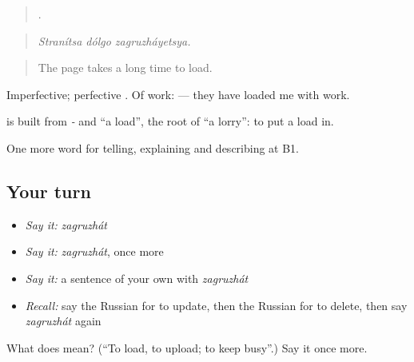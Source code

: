 \begin{quote}
  .
\end{quote}

\begin{quote}
\emph{Stranítsa dólgo zagruzháyetsya.}
\end{quote}

\begin{quote}
The page takes a long time to load.
\end{quote}

Imperfective; perfective \emph{}. Of work: \emph{  } — they have loaded me with work.

\begin{cousinweb}
\textbf{} is built from \emph{-} and \emph{} \textquotedblleft{}a load\textquotedblright{}, the root of \emph{} \textquotedblleft{}a lorry\textquotedblright{}: to put a load in.
\end{cousinweb}

\begin{grammarlens}[title={What you've built}]
One more word for telling, explaining and describing at B1.
\end{grammarlens}

\subsection*{Your turn}
\begin{itemize}
\raggedright
  \item \emph{Say it:} \emph{zagruzhát}
  \item \emph{Say it:} \emph{zagruzhát}, once more
  \item \emph{Say it:} a sentence of your own with \emph{zagruzhát}
  \item \emph{Recall:} say the Russian for to update, then the Russian for to delete, then say \emph{zagruzhát} again
\end{itemize}

\begin{tcolorbox}[breakable,colback=teal!4,colframe=teal!35!black,title={Before you move on}]
What does  mean? (\textquotedblleft{}To load, to upload; to keep busy\textquotedblright{}.) Say it once more.
\end{tcolorbox}
